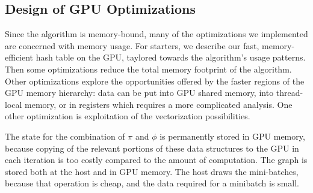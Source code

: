 
\subsection{Design of GPU Optimizations}
\label{sec-gpu-design}


Since the algorithm is memory-bound, many of the optimizations we implemented
are concerned with
memory usage. For starters, we describe our fast, memory-efficient hash table on the GPU,
taylored towards
the algorithm's usage patterns. Then some optimizations reduce the total memory
footprint of the algorithm. Other
optimizations explore the opportunities offered by the faster regions of the
GPU memory hierarchy: data can be put into GPU shared memory, into thread-local
memory, or in registers which requires a more complicated analysis. One
other optimization is exploitation of the vectorization possibilities.

The state for the combination of $\pi$ and $\phi$ is permanently
stored in GPU memory, because copying of the relevant portions of these
data structures to the GPU in each iteration is too costly compared to the amount
of computation. The graph is stored both at the host and in GPU memory. The
host draws the mini-batches, because that operation is cheap,
and the data required for a minibatch is small.


